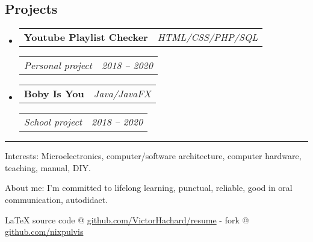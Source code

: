 \documentclass[10pt,letterpaper]{article}
\makeatletter
\newcommand{\latex}{\LaTeX\xspace}
\newenvironment{indentsection}[1]
{\begin{list}{}
  {\setlength{\leftmargin}{#1}} \item[]
}
{\end{list}}
\newcommand{\headerrow}[2]
{\begin{tabular*}{\linewidth}{l@{\extracolsep{\fill}}r}
  #1 &
  #2 \\
\end{tabular*}}
\makeatother
\begin{document}
\subsection*{Projects}
\begin{itemize}
  \parskip=0.1em

  \item
    \headerrow
      {\textbf{Youtube Playlist Checker}}
      {\emph{HTML/CSS/PHP/SQL}}
    \headerrow
      {\emph{Personal project}}
      {\emph{2018 -- 2020}}
    \item
    \headerrow
      {\textbf{Boby Is You}}
      {\emph{Java/JavaFX}}
    \headerrow
      {\emph{School project}}
      {\emph{2018 -- 2020}}
  \end{itemize}


\hrule
\begin{indentsection}{\parindent}
\begin{description*}
\item[Interests:]
  Microelectronics, computer/software architecture, computer hardware, teaching,
  manual, DIY.
\item[About me:]
  I’m committed to lifelong learning, punctual, reliable,
  good in oral communication, autodidact.
\end{description*}
\end{indentsection}


\begin{center}
\footnotesize \latex source code @
\href{http://www.github.com/VictorHachard/resume}
{github.com/VictorHachard/resume} - fork @
\href{http://www.github.com/nixpulvis}
{github.com/nixpulvis}
\end{center}
\end{document}
